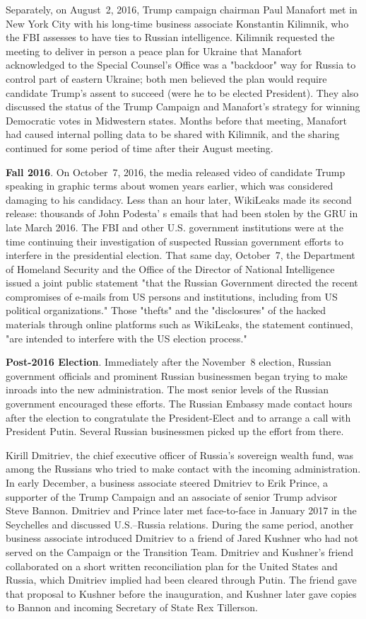 Separately, on August~2, 2016, Trump campaign chairman Paul Manafort met in New York City with his long-time business associate Konstantin Kilimnik, who the FBI assesses to have ties to Russian intelligence.
Kilimnik requested the meeting to deliver in person a peace plan for Ukraine that Manafort acknowledged to the Special Counsel's Office was a "backdoor" way for Russia to control part of eastern Ukraine; both men believed the plan would require candidate Trump's assent to succeed (were he to be elected President).
They also discussed the status of the Trump Campaign and Manafort's strategy for winning Democratic votes in Midwestern states.
Months before that meeting, Manafort had caused internal polling data to be shared with Kilimnik, and the sharing continued for some period of time after their August meeting.

\textbf{Fall 2016}.
On October~7, 2016, the media released video of candidate Trump speaking in graphic terms about women years earlier, which was considered damaging to his candidacy.
Less than an hour later, WikiLeaks made its second release: thousands of John Podesta' s emails that had been stolen by the GRU in late March 2016.
The FBI and other U.S. government institutions were at the time continuing their investigation of suspected Russian government efforts to interfere in the presidential election.
That same day, October~7, the Department of Homeland Security and the Office of the Director of National Intelligence issued a joint public statement "that the Russian Government directed the recent compromises of e-mails from US persons and institutions, including from US political organizations."
Those "thefts" and the "disclosures" of the hacked materials through online platforms such as WikiLeaks, the statement continued, "are intended to interfere with the US election process."

\textbf{Post-2016 Election}.
Immediately after the November~8 election, Russian government officials and prominent Russian businessmen began trying to make inroads into the new administration.
The most senior levels of the Russian government encouraged these efforts.
The Russian Embassy made contact hours after the election to congratulate the President-Elect and to arrange a call with President Putin.
Several Russian businessmen picked up the effort from there.

Kirill Dmitriev, the chief executive officer of Russia's sovereign wealth fund, was among the Russians who tried to make contact with the incoming administration.
In early December, a business associate steered Dmitriev to Erik Prince, a supporter of the Trump Campaign and an associate of senior Trump advisor Steve Bannon.
Dmitriev and Prince later met face-to-face in January 2017 in the Seychelles and discussed U.S.--Russia relations.
During the same period, another business associate introduced Dmitriev to a friend of Jared Kushner who had not served on the Campaign or the Transition Team.
Dmitriev and Kushner's friend collaborated on a short written reconciliation plan for the United States and Russia, which Dmitriev implied had been cleared through Putin.
The friend gave that proposal to Kushner before the inauguration, and Kushner later gave copies to Bannon and incoming Secretary of State Rex Tillerson.

